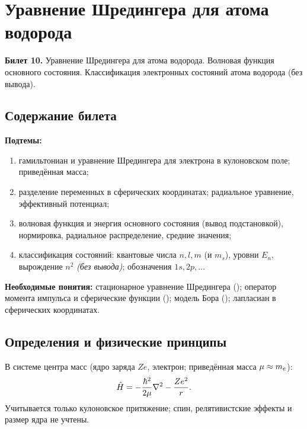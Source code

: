 \chapter[Уравнение Шредингера для атома водорода]%
        {Уравнение Шредингера для атома водорода}
\label{t:10}

\begin{qbox}
\textbf{Билет 10.} Уравнение Шредингера для атома водорода. Волновая функция основного
состояния. Классификация электронных состояний атома водорода (без вывода).
\end{qbox}

\section{Содержание билета}

\textbf{Подтемы:}
\begin{enumerate}
 \item гамильтониан и уравнение Шредингера для электрона в кулоновском поле; приведённая масса;
 \item разделение переменных в сферических координатах; радиальное уравнение, эффективный потенциал;
 \item волновая функция и энергия основного состояния (вывод подстановкой), нормировка,
       радиальное распределение, средние значения;
 \item классификация состояний: квантовые числа $n,l,m$ (и $m_s$), уровни $E_n$, вырождение $n^2$
       \emph{(без вывода)}; обозначения $1s,2p,\dots$
\end{enumerate}

\textbf{Необходимые понятия:} стационарное уравнение Шредингера (); оператор
момента импульса и сферические функции (); модель Бора (); лапласиан
в сферических координатах.

\section{Определения и физические принципы}

\begin{definition}
В системе центра масс (ядро заряда $Ze$, электрон; приведённая масса $\mu\approx m_e$):
\begin{equation}\label{eq:10:H}
  \hat{H}=-\frac{\hbar^2}{2\mu}\nabla^2-\frac{Ze^2}{r}.
\end{equation}
Учитывается только кулоновское притяжение; спин, релятивистские эффекты и размер ядра не учтены.
\end{definition}

